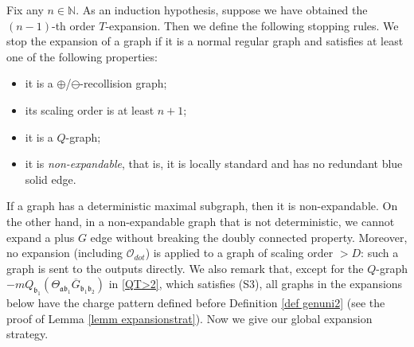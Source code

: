 \documentclass{article}
\newcommand{\1}{\mathds{1}}
\numberwithin{equation}{section}
\newcommand{\fa}{{\mathfrak a}}
\newcommand{\fb}{{\mathfrak b}}
\renewcommand{\cal}{\mathcal}
\newcommand{\N}{\mathbb{N}}
\theoremstyle{plain} %
\newtheorem{definition}[theorem]{Definition}
\theoremstyle{remark}
\newcommand{\cor}{\color{red}}
\newcommand{\hty}[1]{{\cor (ht: #1) }}
\begin{document}
Fix any $n\in \N$. As an induction hypothesis, suppose we have obtained the $(n-1)$-th order $T$-expansion. 
Then we define the following stopping rules. We stop the expansion of a graph if it is a normal regular graph and satisfies at least one of the following properties:
\begin{itemize}
\item[(S1)] it is a $\oplus$/$\ominus$-recollision graph; %

\item[(S2)] its scaling order is at least $n+1$;

\item[(S3)] it is a $Q$-graph; %

\item[(S4)] it is \emph{non-expandable}, that is, it is locally standard and has no redundant blue solid edge. %
\end{itemize}
If a graph has a deterministic maximal subgraph, then it is non-expandable. On the other hand, in a non-expandable graph that is not deterministic, we cannot expand a plus $G$ edge without breaking the doubly connected property. Moreover, no expansion (including $\cal O_{dot}$) is applied to a graph of scaling order $>D$: such a graph is sent to the outputs directly. We also remark that, except for the $Q$-graph $- m Q_{\fb_1} ( \Theta_{\fa\fb_1} \overline G_{\fb_1 \fb_2})$ in \eqref{QT>2}, which satisfies (S3), all graphs in the expansions below have the charge pattern defined before Definition \ref{def genuni2} (see the proof of Lemma \ref{lemm expansionstrat}). Now we give our global expansion strategy. %

\end{document}
